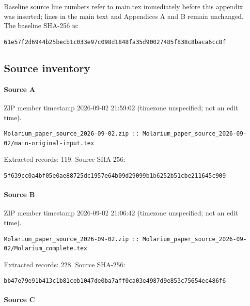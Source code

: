 \documentclass[11pt]{article}
\begin{document}
Baseline source line numbers refer to main.tex immediately before this appendix was inserted; lines in the main text and Appendices A and B remain unchanged. The baseline SHA-256 is:

\begin{lstlisting}
61e57f2d6944b25becb1c033e97c098d1848fa35d90027485f838c8baca6cc8f
\end{lstlisting}

\subsection{Source inventory}

\paragraph{Source A}

ZIP member timestamp 2026-09-02 21:59:02 (timezone unspecified; not an edit time).

\begin{lstlisting}
Molarium_paper_source_2026-09-02.zip :: Molarium_paper_source_2026-09-02/main-original-input.tex
\end{lstlisting}

Extracted records: 119. Source SHA-256:

\begin{lstlisting}
5f639cc0a4bf05e0ae88725dc1957e64b09d29099b1b6252b51cbe211645c909
\end{lstlisting}

\paragraph{Source B}

ZIP member timestamp 2026-09-02 21:06:42 (timezone unspecified; not an edit time).

\begin{lstlisting}
Molarium_paper_source_2026-09-02.zip :: Molarium_paper_source_2026-09-02/Molarium_complete.tex
\end{lstlisting}

Extracted records: 228. Source SHA-256:

\begin{lstlisting}
bb47e79e91b413c1b81ceb1047de0ba7aff0ca03e4987d9e853c75654ec486f6
\end{lstlisting}

\paragraph{Source C}
\end{document}
